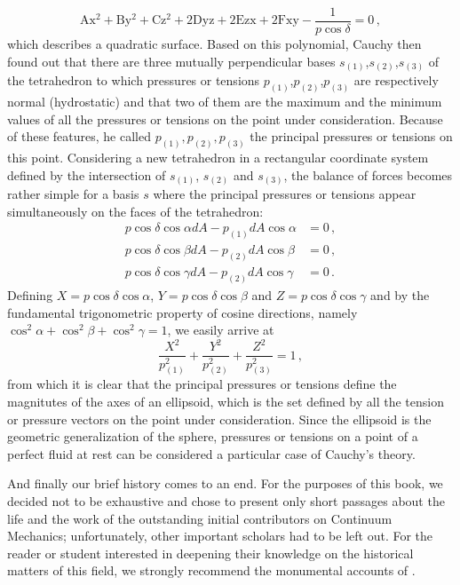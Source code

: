 \begin{equation*}
\text{A}\text{x}^2+\text{B}\text{y}^2+\text{C}\text{z}^2+2\text{D}\text{y}\text{z} +2\text{E}\text{z}\text{x}+2\text{F}\text{x}\text{y}- \dfrac{1}{p\cos\delta} = 0\,,
\end{equation*}  
which describes a quadratic surface. Based on this polynomial, Cauchy then found out that there are three mutually perpendicular bases $s_{(1)}$,$s_{(2)}$,$s_{(3)}$ of the tetrahedron to which pressures or tensions $p_{(1)}$,$p_{(2)}$,$p_{(3)}$ are respectively normal (hydrostatic) and that two of them are the maximum and the minimum values of all the pressures or tensions on the point under consideration. Because of these features, he called $p_{(1)},p_{(2)},p_{(3)}$ the principal pressures or tensions on this point. Considering a new tetrahedron in a rectangular coordinate system defined by the intersection of $s_{(1)}$, $s_{(2)}$ and $s_{(3)}$, the balance of forces becomes rather simple for a basis $s$ where the principal pressures or tensions appear simultaneously on the faces of the tetrahedron:
\begin{align*} 
p\cos\delta\cos\alpha dA - p_{(1)} dA \cos\alpha&= 0\,,\\
p\cos\delta\cos\beta dA - p_{(2)} dA \cos\beta&= 0\,,\\
p\cos\delta\cos\gamma dA - p_{(2)} dA \cos\gamma&= 0\,.
\end{align*} 
Defining $X=p\cos\delta\cos\alpha$, $Y=p\cos\delta\cos\beta$ and $Z=p\cos\delta\cos\gamma$ and by the fundamental trigonometric property of cosine directions, namely $\cos^2\alpha+\cos^2\beta+\cos^2\gamma=1$, we easily arrive at
\begin{equation*}
\dfrac{X^2}{p_{(1)}^2}+\dfrac{Y^2}{p_{(2)}^2}+\dfrac{Z^2}{p_{(3)}^2}=1\,,
\end{equation*}
from which it is clear that the principal pressures or tensions define the magnitutes of the axes of an ellipsoid, which is the set defined by all the tension or pressure vectors on the point under consideration. Since the ellipsoid is the geometric generalization of the sphere, pressures or tensions on a point of a perfect fluid at rest can be considered a particular case of Cauchy's theory.

And finally our brief history comes to an end. For the purposes of this book, we decided not to be exhaustive and chose to present only short passages about the life and the work of the outstanding initial contributors on Continuum Mechanics; unfortunately, other important scholars had to be left out. For the reader or student interested in deepening their knowledge on the historical matters of this field, we strongly recommend the monumental accounts of \cite{maugin_2013} \cite{maugin_2014} \cite{maugin_2016}.


 


